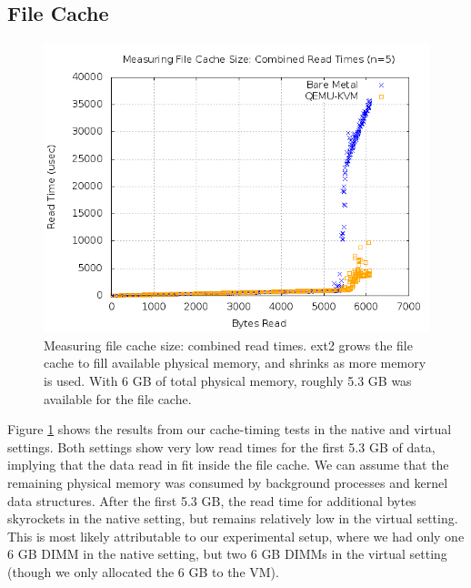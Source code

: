 \documentclass[letterpaper,twocolumn,10pt]{article}
\begin{document}
\subsection{File Cache}
\begin{figure}[!ht]
\includegraphics[scale=.35]{combined_graphs/cache_combined.png}
\caption{Measuring file cache size: combined read times. ext2 grows the file cache to fill available physical memory, and shrinks as more memory is used. With 6 GB of total physical memory, roughly 5.3 GB was available for the file cache.}
\label{fig:file_cache}
\end{figure}
Figure \ref{fig:file_cache} shows the results from our cache-timing tests in the native and virtual settings. 
Both settings show very low read times for the first 5.3 GB of data, implying that the data read in fit inside the file cache. 
We can assume that the remaining physical memory was consumed by background processes and kernel data structures. 
After the first 5.3 GB, the read time for additional bytes skyrockets in the native setting, but remains relatively low in the virtual setting. 
This is most likely attributable to our experimental setup, where we had only one 6 GB DIMM in the native setting, but two 6 GB DIMMs in the virtual setting (though we only allocated the 6 GB to the VM). 
\end{document}

